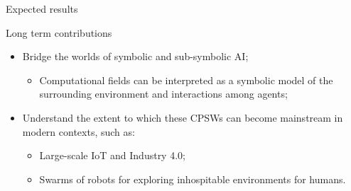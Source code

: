 \documentclass[presentation]{beamer}\mode<presentation>{\usetheme{AMSBolognaFC}}
\begin{document}
\begin{frame}[c]{Expected results}
\begin{alertblock}{Long term contributions}
	\begin{itemize}
		\item Bridge the worlds of symbolic and sub-symbolic AI;
		\begin{itemize}
			\item Computational fields can be interpreted as a symbolic model 
				of the surrounding environment and interactions among agents;
		\end{itemize}
		\item Understand the extent to which these CPSWs can 
			become mainstream in modern contexts, such as:
		\begin{itemize}
			\item Large-scale IoT and Industry 4.0;
			\item Swarms of robots for exploring inhospitable environments for humans.
		\end{itemize}
	\end{itemize}
\end{alertblock}

\end{frame}


\end{document}
